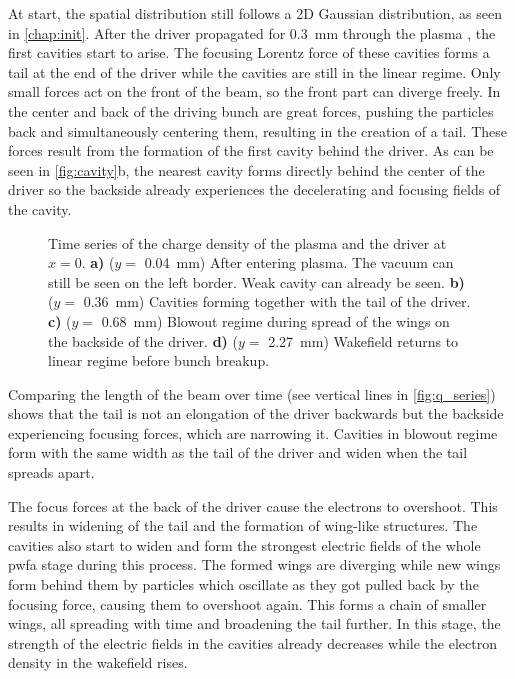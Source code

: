 \documentclass[bachelor_thesis]{subfiles}
\begin{document}
At start, the spatial distribution still follows a 2D Gaussian distribution, as seen in \autoref{chap:init}. After the driver propagated for \qty{0.3}{mm} through the plasma , the first cavities start to arise. The focusing Lorentz force of these cavities forms a tail at the end of the driver while the cavities are still in the linear regime.
Only small forces act on the front of the beam, so the front part can diverge freely. In the center and back of the driving bunch are great forces, pushing the particles back and simultaneously centering them, resulting in the creation of a tail.
These forces result from the formation of the first cavity behind the driver. As can be seen in \autoref{fig:cavity}b, the nearest cavity forms directly behind the center of the driver so the backside already experiences the decelerating and focusing fields of the cavity.
\begin{figure}
	\centering
	
	\caption{Time series of the charge density of the plasma and the driver at $x=0$.
	\textbf{a)} ($y=$ \qty{0.04}{mm}) After entering plasma. The vacuum can still be seen on the left border. Weak cavity can already be seen.
	\textbf{b)} ($y=$ \qty{0.36}{mm}) Cavities forming together with the tail of the driver.
	\textbf{c)} ($y=$ \qty{0.68}{mm}) Blowout regime during spread of the wings on the backside of the driver.
	\textbf{d)} ($y=$ \qty{2.27}{mm}) Wakefield returns to linear regime before bunch breakup.}
	\label{fig:cavity}
\end{figure}
Comparing the length of the beam over time (see vertical lines in \autoref{fig:q_series}) shows that the tail is not an elongation of the driver backwards but the backside experiencing focusing forces, which are narrowing it.
Cavities in blowout regime form with the same width as the tail of the driver and widen when the tail spreads apart.

The focus forces at the back of the driver cause the electrons to overshoot. This results in widening of the tail and the formation of wing-like structures. The cavities also start to widen and form the strongest electric fields of the whole \gls{pwfa} stage during this process.
The formed wings are diverging while new wings form behind them by particles which oscillate as they got pulled back by the focusing force, causing them to overshoot again. This forms a chain of smaller wings, all spreading with time and broadening the tail further.
In this stage, the strength of the electric fields in the cavities already decreases while the electron density in the wakefield rises.
\end{document}
